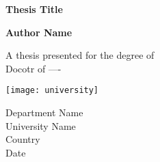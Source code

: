 \begin{titlepage}
    \begin{center}
        \vspace*{1cm}
        
        \textbf{Thesis Title}
        
        \vspace{0.5cm}
        
        \textbf{Author Name}
        
        \vfill
        
        A thesis presented for the degree of\\
        Docotr of ----
        
        \vspace{0.8cm}
        
        \texttt{[image: university]}
        
        Department Name\\
        University Name\\
        Country\\
        Date\\
        
        
    \end{center}
\end{titlepage}